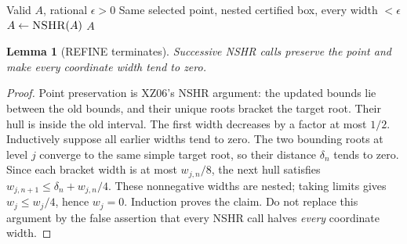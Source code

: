 \documentclass[11pt]{article}
\newtheorem{lemma}[theorem]{Lemma}
\theoremstyle{definition}
\newcommand{\width}{\operatorname{width}}
\newcommand{\alg}[1]{\textsc{#1}}
\begin{document}
\begin{algorithm}[H]
\caption{REFINE: precision wrapper around XZ06 NSHR}\label{a:refine}
\begin{algorithmic}[1]
\Require Valid $A$, rational $\epsilon>0$
\Ensure Same selected point, nested certified box, every width $<\epsilon$
\While{$\max_j\width(B_j)\ge\epsilon$}
 \State $A\gets\alg{NSHR}(A)$ 
\EndWhile
\State \Return $A$
\end{algorithmic}
\end{algorithm}
\begin{lemma}[REFINE terminates]\label{l:refine}
Successive NSHR calls preserve the point and make every coordinate width tend to zero.
\end{lemma}
\begin{proof}
Point preservation is XZ06's NSHR argument: the updated bounds lie between the
old bounds, and their unique roots bracket the target root. Their hull is inside
the old interval. The first width decreases by a factor at most $1/2$.
Inductively suppose all earlier widths tend to zero. The two bounding roots at
level $j$ converge to the same simple target root, so their distance $\delta_n$
tends to zero. Since each bracket width is at most $w_{j,n}/8$, the next hull
satisfies $w_{j,n+1}\le\delta_n+w_{j,n}/4$. These nonnegative widths are nested;
taking limits gives $w_j\le w_j/4$, hence $w_j=0$. Induction proves the claim.
Do not replace this argument by the false assertion that every NSHR call halves
\emph{every} coordinate width.
\end{proof}
\end{document}
